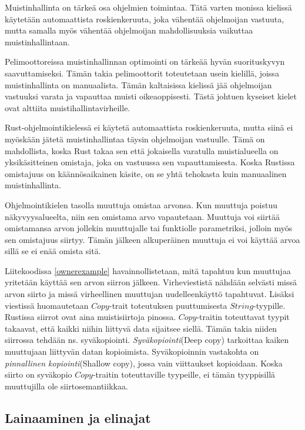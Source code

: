 \documentclass[finnish]{tktltiki2}
\theoremstyle{definition}
\theoremstyle{remark}
\begin{document}
Muistinhallinta on tärkeä osa ohjelmien toimintaa. Tätä varten monissa kielissä käytetään automaattista roskienkeruuta, joka vähentää ohjelmoijan vastuuta, mutta samalla myös vähentää ohjelmoijan mahdollisuuksia vaikuttaa muistinhallintaan.

Pelimoottoreissa muistinhallinnan optimointi on tärkeää hyvän suorituskyvyn saavuttamiseksi. Tämän takia pelimoottorit toteutetaan usein kielillä, joissa muistinhallinta on manuaalista. Tämän kaltaisissa kielissä jää ohjelmoijan vastuuksi varata ja vapauttaa muisti oikeaoppisesti. Tästä johtuen kyseiset kielet ovat alttiita muistihallintavirheille. \cite{CVE}

Rust-ohjelmointikielessä ei käytetä automaattista roskienkeruuta, mutta siinä ei myöskään jätetä muistinhallintaa täysin ohjelmoijan vastuulle. Tämä on mahdollista, koska Rust takaa sen että jokaisella varatulla muistialueella on yksikäsitteinen omistaja, joka on vastuussa sen vapauttamisesta. Koska Rustissa omistajuus on käännösaikainen käsite, on se yhtä tehokasta kuin manuaalinen muistinhallinta. \cite{TheGoodBook}

Ohjelmointikielen tasolla muuttuja omistaa arvonsa. Kun muuttuja poistuu näkyvyysalueelta, niin sen omistama arvo vapautetaan. Muuttuja voi siirtää omistamansa arvon jollekin muuttujalle tai funktiolle parametriksi, jolloin myös sen omistajuus siirtyy. Tämän jälkeen alkuperäinen muuttuja ei voi käyttää arvoa sillä se ei enää omista sitä.

Liitekoodissa \ref{ownerexample} havainnollistetaan, mitä tapahtuu kun muuttujaa yritetään käyttää sen arvon siirron jälkeen. Virheviestistä nähdään selvästi missä arvon siirto ja missä virheellinen muuttujan uudelleenkäyttö tapahtuvat. Lisäksi viestissä huomautetaan $Copy$-trait toteutuksen puuttumisesta $String$-tyypille. Rustissa siirrot ovat aina muistisiirtoja pinossa. $Copy$-traitin toteuttavat tyypit takaavat, että kaikki niihin liittyvä data sijaitsee siellä. Tämän takia niiden siirrossa tehdään ns. syväkopiointi. \textit{Syväkopiointi}(Deep copy) tarkoittaa kaiken muuttujaan liittyvän datan kopioimista. Syväkopioinnin vastakohta on \textit{pinnallinen kopiointi}(Shallow copy), jossa vain viittaukset kopioidaan. Koska siirto on syväkopio $Copy$-traitin toteuttaville tyypeille, ei tämän tyyppisillä muuttujilla ole siirtosemantiikkaa.

\subsection{Lainaaminen ja elinajat}
\end{document}
